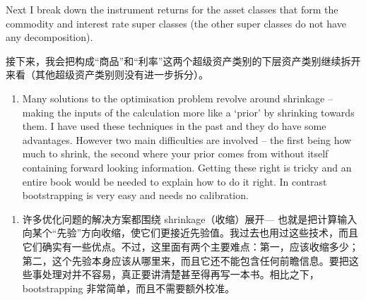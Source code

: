 \bipairgap

\begin{englishblock} Next I break down the instrument returns for the asset classes that form the commodity and interest rate super classes (the other super classes do not have any decomposition). \end{englishblock}

\begin{chineseblock}接下来，我会把构成“商品”和“利率”这两个超级资产类别的下层资产类别继续拆开来看（其他超级资产类别则没有进一步拆分）。\end{chineseblock}

\begin{enumerate}
\item Many solutions to the optimisation problem revolve around shrinkage -- making the inputs of the calculation more like a ‘prior' by shrinking towards them. I have used these techniques in the past and they do have some advantages. However two main difficulties are involved -- the first being how much to shrink, the second where your prior comes from without itself containing forward looking information. Getting these right is tricky and an entire book would be needed to explain how to do it right. In contrast bootstrapping is very easy and needs no calibration. \end{enumerate}

\begin{enumerate}
\item 许多优化问题的解决方案都围绕 shrinkage（收缩）展开--- 也就是把计算输入向某个“先验”方向收缩，使它们更接近先验值。我过去也用过这些技术，而且它们确实有一些优点。不过，这里面有两个主要难点：第一，应该收缩多少；第二，这个先验本身应该从哪里来，而且它还不能包含任何前瞻信息。要把这些事处理对并不容易，真正要讲清楚甚至得再写一本书。相比之下，bootstrapping 非常简单，而且不需要额外校准。\end{enumerate}

